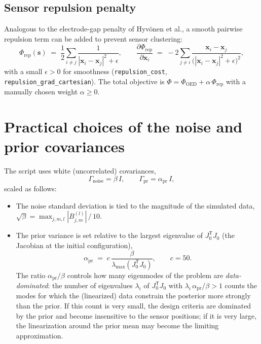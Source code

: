 \documentclass[11pt,a4paper]{article}
\newcommand{\T}{\mathsf{T}}
\newcommand{\Gnoise}{\Gamma_{\mathrm{noise}}}
\newcommand{\Gprior}{\Gamma_{\mathrm{pr}}}
\newcommand{\code}[1]{\texttt{#1}}
\begin{document}
\subsection{Sensor repulsion penalty}

Analogous to the electrode-gap penalty of Hyv\"onen et al., a smooth pairwise repulsion term can
be added to prevent sensor clustering:
\begin{equation}
  \Phi_{\mathrm{rep}}(\bm{s})
  \;=\;
  \frac{1}{2} \sum_{i \neq j} \frac{1}{|\bm{x}_i - \bm{x}_j|^2 + \epsilon},
  \qquad
  \frac{\partial \Phi_{\mathrm{rep}}}{\partial \bm{x}_i}
  \;=\;
  -2 \sum_{j \neq i} \frac{\bm{x}_i - \bm{x}_j}{\big(|\bm{x}_i - \bm{x}_j|^2 + \epsilon\big)^2},
\end{equation}
with a small $\epsilon > 0$ for smoothness (\code{repulsion\_cost},
\code{repulsion\_grad\_cartesian}). The total objective is
$\Phi = \Phi_{\mathrm{OED}} + \alpha\, \Phi_{\mathrm{rep}}$ with a manually chosen weight
$\alpha \geq 0$.

\section{Practical choices of the noise and prior covariances}
\label{sec:practical}

The script uses white (uncorrelated) covariances,
\begin{equation}
  \Gnoise = \beta\, I, \qquad \Gprior = \alpha_{\mathrm{pr}}\, I,
\end{equation}
scaled as follows:
\begin{itemize}
  \item The noise standard deviation is tied to the magnitude of the simulated data,
        $\sqrt{\beta} = \max_{j,m,l} |B_{j,m}^{(l)}| \,/\, 10$.
  \item The prior variance is set relative to the largest eigenvalue of $J_0^\T J_0$ (the
        Jacobian at the initial configuration),
        \begin{equation}
          \alpha_{\mathrm{pr}} \;=\; c\, \frac{\beta}{\lambda_{\max}(J_0^\T J_0)},
          \qquad c = 50 .
        \end{equation}
        The ratio $\alpha_{\mathrm{pr}}/\beta$ controls how many eigenmodes of the problem are
        \emph{data-dominated}: the number of eigenvalues $\lambda_i$ of $J_0^\T J_0$ with
        $\lambda_i\, \alpha_{\mathrm{pr}} / \beta > 1$ counts the modes for which the
        (linearized) data constrain the posterior more strongly than the prior. If this count is
        very small, the design criteria are dominated by the prior and become insensitive to the
        sensor positions; if it is very large, the linearization around the prior mean may become
        the limiting approximation.
\end{itemize}
\end{document}
